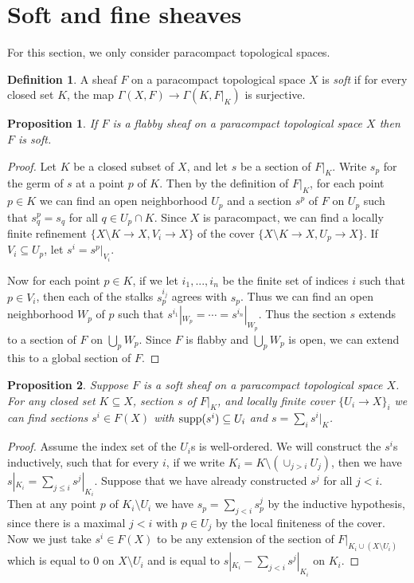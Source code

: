 \documentclass[letterpaper,11pt]{article}
\newtheorem{prop}{Proposition}
\theoremstyle{definition}
\newtheorem{defn}{Definition}
\theoremstyle{remark}
\begin{document}
\section{Soft and fine sheaves}

For this section, we only consider paracompact topological spaces.

\begin{defn} A sheaf $F$ on a paracompact topological space $X$ is \emph{soft} if for every closed set $K$, the map $\Gamma(X,F) \rightarrow \Gamma(K,F|_K)$ is surjective.
\end{defn}

\begin{prop}\label{flabbysoft} If $F$ is a flabby sheaf on a paracompact topological space $X$ then $F$ is soft.
\end{prop}
\begin{proof} Let $K$ be a closed subset of $X$, and let $s$ be a section of $F|_K$. Write $s_p$ for the germ of $s$ at a point $p$ of $K$. Then by the definition of $F|_K$, for each point $p\in K$ we can find an open neighborhood $U_p$ and a section $s^p$ of $F$ on $U_p$ such that $s^p_q = s_q$ for all $q\in U_p\cap K$. Since $X$ is paracompact, we can find a locally finite refinement $\{X\setminus K\rightarrow X, V_i\rightarrow X\}$ of the cover $\{X\setminus K\rightarrow X, U_p\rightarrow X\}$. If $V_i\subseteq U_p$, let $s^i = s^p|_{V_i}$.

Now for each point $p\in K$, if we let $i_1, ..., i_n$ be the finite set of indices $i$ such that $p\in V_i$, then each of the stalks $s^{i_j}_p$ agrees with $s_p$. Thus we can find an open neighborhood $W_p$ of $p$ such that $s^{i_1}|_{W_p} = \cdots = s^{i_n}|_{W_p}$. Thus the section $s$ extends to a section of $F$ on $\bigcup_p W_p$. Since $F$ is flabby and $\bigcup_p W_p$ is open, we can extend this to a global section of $F$.
\end{proof}

\begin{prop} Suppose $F$ is a soft sheaf on a paracompact topological space $X$. For any closed set $K\subseteq X$, section $s$ of $F|_K$, and locally finite cover $\{U_i \rightarrow X\}_i$ we can find sections $s^i\in F(X)$ with $\mbox{\rm supp}(s^i)\subseteq U_i$ and $s = \sum_i s^i|_K$.
\end{prop}
\begin{proof} Assume the index set of the $U_i$s is well-ordered. We will construct the $s^i$s inductively, such that for every $i$, if we write $K_i = K\setminus(\cup_{j>i}U_j)$, then we have $s|_{K_i} = \sum_{j \le i}s^j|_{K_i}$. Suppose that we have already constructed $s^j$ for all $j < i$. Then at any point $p$ of $K_i \setminus U_i$ we have $s_p = \sum_{j < i}s^j_p$ by the inductive hypothesis, since there is a maximal $j < i$ with $p\in U_j$ by the local finiteness of the cover. Now we just take $s^i\in F(X)$ to be any extension of the section of $F|_{K_i\cup (X\setminus U_i)}$ which is equal to $0$ on $X\setminus U_i$ and is equal to $s|_{K_i} - \sum_{j < i}s^j|_{K_i}$ on $K_i$.
\end{proof}
\end{document}
